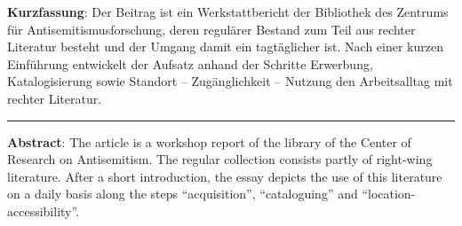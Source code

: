 \textbf{Kurzfassung}: Der Beitrag ist ein Werkstattbericht der
Bibliothek des Zentrums für Antisemitismusforschung, deren regulärer
Bestand zum Teil aus rechter Literatur besteht und der Umgang damit ein
tagtäglicher ist. Nach einer kurzen Einführung entwickelt der Aufsatz
anhand der Schritte Erwerbung, Katalogisierung sowie Standort --
Zugänglichkeit -- Nutzung den Arbeitsalltag mit rechter Literatur.

\begin{center}\rule{0.5\linewidth}{\linethickness}\end{center}

\textbf{Abstract}: The article is a workshop report of the library of
the Center of Research on Antisemitism. The regular collection consists
partly of right-wing literature. After a short introduction, the essay
depicts the use of this literature on a daily basis along the steps
``acquisition'', ``cataloguing'' and ``location-accessibility''.
